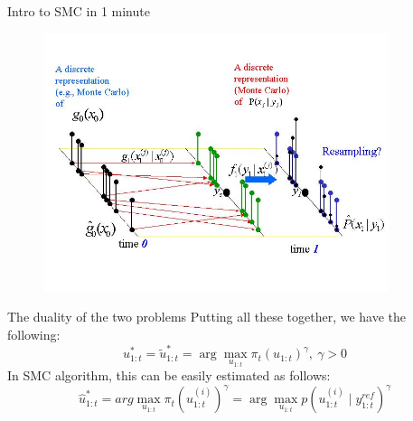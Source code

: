 \documentclass[handout]{beamer}
\begin{document}
\begin{frame}{Intro to SMC in 1 minute}
  \begin{figure}
    \centering
    \includegraphics[width = 0.9\textwidth]{figures/pfilter.jpg}
  \end{figure}
\end{frame}

\begin{frame}{The duality of the two problems}
Putting all these together, we have the following:
\begin{equation*}
  u^*_{1:t} = \tilde{u}^*_{1:t} = \arg\max_{u_{1:t}} \pi_t(u_{1:t})^\gamma,~\gamma > 0
\end{equation*}
In SMC algorithm, this can be easily estimated as follows:
\begin{equation*}
\hat{u}^*_{1:t} = arg\max_{u_{1:t}} \pi_t(u^{(i)}_{1:t})^\gamma = \arg\max_{u_{1:t}} p(u^{(i)}_{1:t} \mid y^{ref}_{1:t})^\gamma
\end{equation*}
\end{frame}
\end{document}
